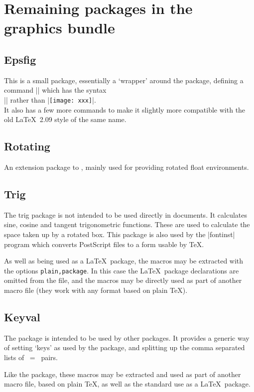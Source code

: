 \section{Remaining packages in the graphics bundle}

\subsection{Epsfig}
This is a small package, essentially a `wrapper' around the
 package, defining a command |\psfig| which has the
syntax\\
|| rather than |\texttt{[image: xxx]}|.\\
It also has a few more commands to make it slightly more compatible with
the old \LaTeX~2.09 style of the same name.

\subsection{Rotating}
An extension package to , mainly used for providing
rotated float environments.

\subsection{Trig}
The trig package is not intended to be used directly in documents. It
calculates sine, cosine and tangent trigonometric functions. These
are used to calculate the space taken up by a rotated box. This
package is also used by the |fontinst| program which converts
PostScript files to a form usable by \TeX.

As well as being used as a \LaTeX\ package, the macros may be extracted
with the  options \texttt{plain,package}. In this case
the \LaTeX\ package declarations are omitted from the file, and the
macros may be directly used as part of another macro file (they work
with any format based on plain \TeX).

\subsection{Keyval}
The  package is intended to be used by other
packages. It provides a generic way of setting `keys' as used by the
 package, and splitting up the comma separated lists
of ~=~ pairs.

Like the  package, these macros may be extracted and used
as part of another macro file, based on plain \TeX, as well as the
standard use as a \LaTeX\ package.

